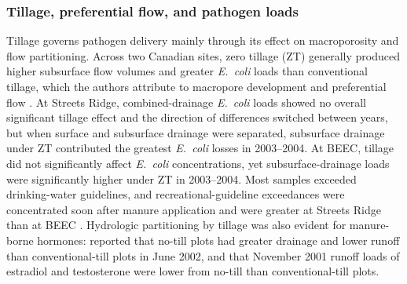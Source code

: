 \documentclass[11pt]{article}
\begin{document}
\subsubsection{Tillage, preferential flow, and pathogen loads}
Tillage governs pathogen delivery mainly through its effect on macroporosity and flow partitioning. Across two Canadian sites, zero tillage (ZT) generally produced higher subsurface flow volumes and greater \textit{E.\ coli} loads than conventional tillage, which the authors attribute to macropore development and preferential flow \parencite{Thiagarajan2007}. At Streets Ridge, combined-drainage \textit{E.\ coli} loads showed no overall significant tillage effect and the direction of differences switched between years, but when surface and subsurface drainage were separated, subsurface drainage under ZT contributed the greatest \textit{E.\ coli} losses in 2003--2004. At BEEC, tillage did not significantly affect \textit{E.\ coli} concentrations, yet subsurface-drainage loads were significantly higher under ZT in 2003--2004. Most samples exceeded drinking-water guidelines, and recreational-guideline exceedances were concentrated soon after manure application and were greater at Streets Ridge than at BEEC \parencite{Thiagarajan2007}. Hydrologic partitioning by tillage was also evident for manure-borne hormones: \textcite{Jenkins2009} reported that no-till plots had greater drainage and lower runoff than conventional-till plots in June 2002, and that November 2001 runoff loads of estradiol and testosterone were lower from no-till than conventional-till plots.
\end{document}
